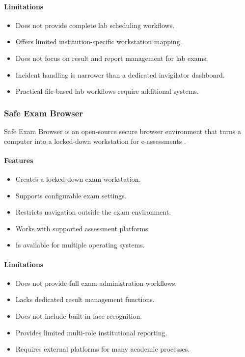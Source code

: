 \paragraph{Limitations}
\begin{itemize}[noitemsep]
\item Does not provide complete lab scheduling workflows.
\item Offers limited institution-specific workstation mapping.
\item Does not focus on result and report management for lab exams.
\item Incident handling is narrower than a dedicated invigilator dashboard.
\item Practical file-based lab workflows require additional systems.
\end{itemize}

\subsubsection{Safe Exam Browser}
Safe Exam Browser is an open-source secure browser environment that turns a computer into a locked-down workstation for e-assessments \cite{seb1}.

\paragraph{Features}
\begin{itemize}[noitemsep]
\item Creates a locked-down exam workstation.
\item Supports configurable exam settings.
\item Restricts navigation outside the exam environment.
\item Works with supported assessment platforms.
\item Is available for multiple operating systems.
\end{itemize}

\paragraph{Limitations}
\begin{itemize}[noitemsep]
\item Does not provide full exam administration workflows.
\item Lacks dedicated result management functions.
\item Does not include built-in face recognition.
\item Provides limited multi-role institutional reporting.
\item Requires external platforms for many academic processes.
\end{itemize}

